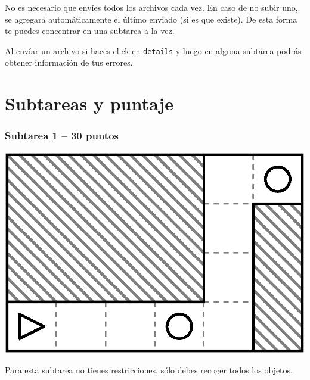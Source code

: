 \documentclass{oci}
\begin{document}
No es necesario que envíes todos los archivos cada vez. En caso de no subir uno, se agregará automáticamente el último enviado (si es que existe).
De esta forma te puedes concentrar en una subtarea a la vez.

Al envíar un archivo si haces click en \texttt{details} y luego en alguna subtarea podrás obtener información de tus errores.


\section*{Subtareas y puntaje}

\subsubsection*{Subtarea 1 -- 30 puntos}
\begin{minipage}{0.5\linewidth}
  \centering
\includegraphics[scale=0.5]{laberintos/Subtarea1.eps}
\end{minipage}
\begin{minipage}{0.45\linewidth}
Para esta subtarea no tienes restricciones, sólo debes recoger todos los objetos.
\end{minipage}
\end{document}
